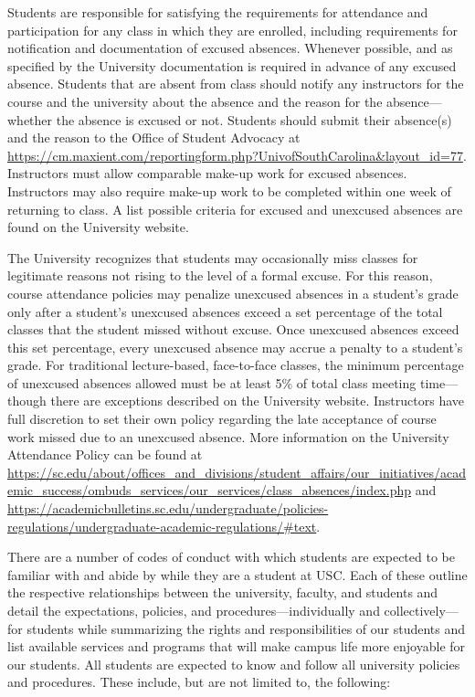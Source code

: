 \documentclass[11pt,letterpaper]{article}
\begin{document}
Students are responsible for satisfying the requirements for attendance and participation for any class in which they are enrolled, including requirements for notification and documentation of excused absences. Whenever possible, and as specified by the University documentation is required in advance of any excused absence. Students that are absent from class should notify any instructors for the course and the university about the absence and the reason for the absence---whether the absence is excused or not. Students should submit their absence(s) and the reason to the Office of Student Advocacy at \url{https://cm.maxient.com/reportingform.php?UnivofSouthCarolina\&layout_id=77}. Instructors must allow comparable make-up work for excused absences. Instructors may also require make-up work to be completed within one week of returning to class. A list possible criteria for excused and unexcused absences are found on the University website. \pspace

The University recognizes that students may occasionally miss classes for legitimate reasons not rising to the level of a formal excuse. For this reason, course attendance policies may penalize unexcused absences in a student's grade only after a student's unexcused absences exceed a set percentage of the total classes that the student missed without excuse. Once unexcused absences exceed this set percentage, every unexcused absence may accrue a penalty to a student’s grade. For traditional lecture-based, face-to-face classes, the minimum percentage of unexcused absences allowed must be at least 5\% of total class meeting time---though there are exceptions described on the University website. Instructors have full discretion to set their own policy regarding the late acceptance of course work missed due to an unexcused absence. More information on the University Attendance Policy can be found at \url{https://sc.edu/about/offices_and_divisions/student_affairs/our_initiatives/academic_success/ombuds_services/our_services/class_absences/index.php} and \url{https://academicbulletins.sc.edu/undergraduate/policies-regulations/undergraduate-academic-regulations/\#text}. 
\sectionbreak




There are a number of codes of conduct with which students are expected to be familiar with and abide by while they are a student at USC. Each of these outline the respective relationships between the university, faculty, and students and detail the expectations, policies, and procedures---individually and collectively---for students while summarizing the rights and responsibilities of our students and list available services and programs that will make campus life more enjoyable for our students. All students are expected to know and follow all university policies and procedures. These include, but are not limited to, the following: \pspace
\end{document}
